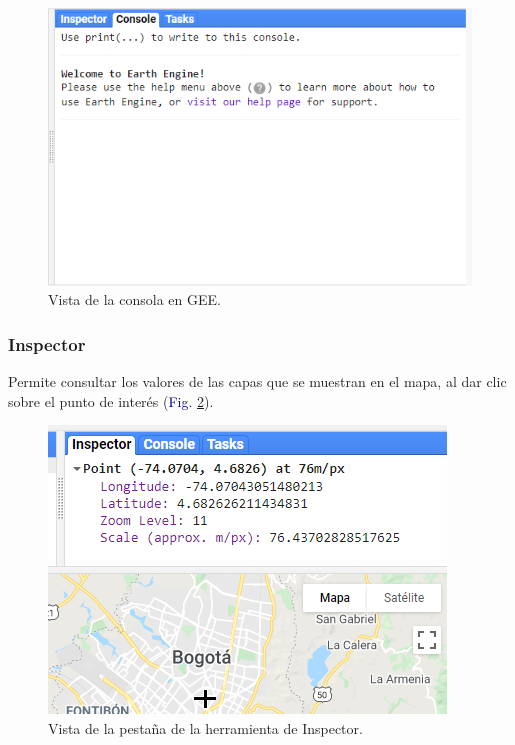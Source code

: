 \documentclass[
  12pt,
  letterpaper,
  twoside]{book}
\begin{document}
\begin{figure}[H]

{\centering \includegraphics[width=0.8\linewidth]{Img/rigthPanel} 

}

\caption{Vista de la consola en GEE.}\label{fig:f219}
\end{figure}

\hypertarget{inspector}{%
\subsubsection*{Inspector}\label{inspector}}

Permite consultar los valores de las capas que se muestran en el mapa, al dar clic sobre el punto de interés (\textcolor{darkblue}{Fig.} \ref{fig:f220}).

\begin{figure}[H]

{\centering \includegraphics[width=0.95\linewidth]{Img/inspector} 

}

\caption{Vista de la pestaña de la herramienta de Inspector.}\label{fig:f220}
\end{figure}
\end{document}
